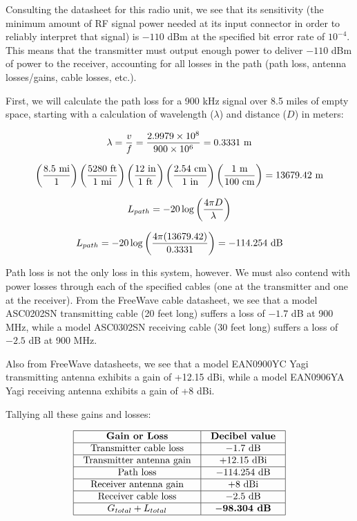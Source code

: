 Consulting the datasheet for this radio unit, we see that its sensitivity (the minimum amount of RF signal power needed at its input connector in order to reliably interpret that signal) is $-110$ dBm at the specified bit error rate of $10^{-4}$.  This means that the transmitter must output enough power to deliver $-110$ dBm of power to the receiver, accounting for all losses in the path (path loss, antenna losses/gains, cable losses, etc.).

\vskip 10pt

First, we will calculate the path loss for a 900 kHz signal over 8.5 miles of empty space, starting with a calculation of wavelength ($\lambda$) and distance ($D$) in meters:

$$\lambda = {v \over f} = {2.9979 \times 10^8 \over 900 \times 10^6} = 0.3331 \hbox{ m}$$

$$\left(8.5 \hbox{ mi} \over 1 \right) \left(5280 \hbox{ ft} \over 1 \hbox{ mi} \right) \left(12 \hbox{ in} \over 1 \hbox{ ft} \right) \left(2.54 \hbox{ cm} \over 1 \hbox{ in} \right) \left(1 \hbox{ m} \over 100 \hbox{ cm} \right) = 13679.42 \hbox{ m}$$

$$L_{path} = -20 \log \left(4 \pi D \over \lambda \right)$$

$$L_{path} = -20 \log \left(4 \pi (13679.42) \over 0.3331 \right) = -114.254 \hbox{ dB}$$

\vskip 10pt

Path loss is not the only loss in this system, however.  We must also contend with power losses through each of the specified cables (one at the transmitter and one at the receiver).  From the FreeWave cable datasheet, we see that a model ASC0202SN transmitting cable (20 feet long) suffers a loss of $-1.7$ dB at 900 MHz, while a model ASC0302SN receiving cable (30 feet long) suffers a loss of $-2.5$ dB at 900 MHz.

\vskip 10pt

Also from FreeWave datasheets, we see that a model EAN0900YC Yagi transmitting antenna exhibits a gain of +12.15 dBi, while a model EAN0906YA Yagi receiving antenna exhibits a gain of +8 dBi.

\vskip 10pt

Tallying all these gains and losses:


$$\vbox{\offinterlineskip
\halign{\strut
\vrule \quad\hfil # \ \hfil & 
\vrule \quad\hfil # \ \hfil \vrule \cr
\noalign{\hrule}
%
{\bf Gain or Loss} & {\bf Decibel value} \cr
%
\noalign{\hrule}
%
Transmitter cable loss & $-1.7$ dB \cr
%
\noalign{\hrule}
%
Transmitter antenna gain & +12.15 dBi \cr
%
\noalign{\hrule}
%
Path loss & $-114.254$ dB \cr
%
\noalign{\hrule}
%
Receiver antenna gain & +8 dBi \cr
%
\noalign{\hrule}
%
Receiver cable loss & $-2.5$ dB \cr
%
\noalign{\hrule}
%
$G_{total} + L_{total}$ & {\bf $-$98.304 dB} \cr
%
\noalign{\hrule}
} %
}$$ %

